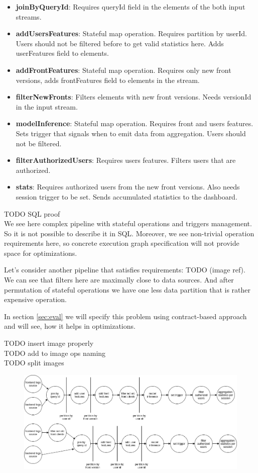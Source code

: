 \begin{itemize}
    \item \textbf{joinByQueryId}: Requires queryId field in the elements of the both input streams.
    \item \textbf{addUsersFeatures}: Stateful map operation. Requires partition by userId. Users should not be filtered before to get valid statistics here. Adds userFeatures field to elements.
    \item \textbf{addFrontFeatures}: Stateful map operation. Requires only new front versions, adds frontFeatures field to elements in the stream.
    \item \textbf{filterNewFronts}: Filters elements with new front versions. Needs versionId in the input stream.
    \item \textbf{modelInference}: Stateful map operation. Requires front and users features. Sets trigger that signals when to emit data from aggregation. Users should not be filtered.
    \item \textbf{filterAuthorizedUsers}: Requires users features. Filters users that are authorized.
    \item \textbf{stats}: Requires authorized users from the new front versions. Also needs session trigger to be set. Sends accumulated statistics to the dashboard.
\end{itemize}

TODO SQL proof\\
We see here complex pipeline with stateful operations and triggers management.
So it is not possible to describe it in SQL.
Moreover, we see non-trivial operation requirements here, so concrete execution graph specification will not provide space for optimizations.

Let's consider another pipeline that satisfies requirements: TODO (image ref).
We can see that filters here are maximally close to data sources.
And after permutation of stateful operations we have one less data partition that is rather expensive operation.

In section \ref{sec:eval} we will specify this problem using contract-based approach and will see, how it helps in optimizations.

TODO insert image properly \\
TODO add to image ops naming \\
TODO split images \\
\begin{figure}
    \label{fig:running-example-suboptimal}
    \label{fig:running-example-optimal}
    \includegraphics[width=\linewidth]{images/debs-calco-example}
\end{figure}
